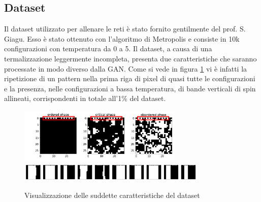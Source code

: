 \documentclass[a4paper]{article}
\begin{document}
\subsection{Dataset}
Il dataset utilizzato per allenare le reti è stato fornito gentilmente del prof. S. Giagu. Esso è stato ottenuto con l'algoritmo di Metropolis e consiste in 10k configurazioni con temperatura da 0 a 5. Il dataset, a causa di una termalizzazione leggermente incompleta, presenta due caratteristiche che saranno processate in modo diverso dalla GAN. Come si vede in figura \ref{difetti} vi è infatti la ripetizione di un pattern nella prima riga di pixel di quasi tutte le configurazioni e la presenza, nelle configurazioni a bassa temperatura, di bande verticali di spin allineati, corrispondenti in totale all'1\% del dataset.
\begin{figure}[H]
\includegraphics[width=0.7\textwidth]{dataset.png}\\
\includegraphics[width=0.8\textwidth]{difetti.png}
\centering
\caption{Visualizzazione delle suddette caratteristiche del dataset}
\label{difetti}
\end{figure}
\end{document}
